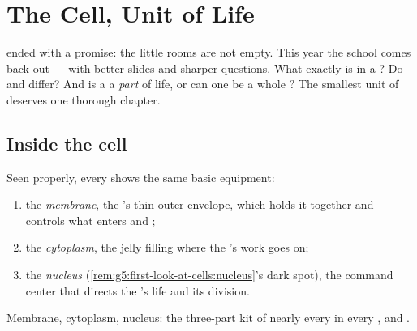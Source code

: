 \chapter{The Cell, Unit of Life}\label{ch:g6:cell-unit-of-life}

 ended with a promise: the
little rooms are not empty. This year the school 
comes back out --- with better slides and sharper questions.
What exactly is in a ? Do  and   differ?
And is a  a \emph{part} of life, or can one  be a
whole ? The smallest unit of  deserves
one thorough chapter.

\section{Inside the cell}

\begin{definition}\label{def:g6:cell-unit-of-life:parts}
Seen properly, every  shows the same basic equipment:
\begin{enumerate}
  \item the \emph{membrane}, the 's
        thin outer envelope, which holds it together and
        controls what enters and ;
  \item the \emph{cytoplasm}, the jelly
        filling where the 's work goes on;
  \item the \emph{nucleus}
        (\cref{rem:g5:first-look-at-cells:nucleus}'s dark
        spot), the command center that directs the 's
        life and its division.
\end{enumerate}
Membrane, cytoplasm, nucleus: the three-part kit of nearly
every  in every ,  and .
\end{definition}

